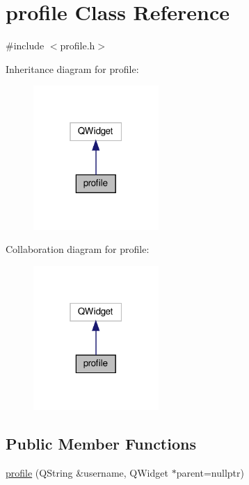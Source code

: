 \hypertarget{classprofile}{}\section{profile Class Reference}
\label{classprofile}


{\ttfamily \#include $<$profile.\+h$>$}



Inheritance diagram for profile\+:
\nopagebreak
\begin{figure}[H]
\begin{center}
\leavevmode
\includegraphics[width=135pt]{classprofile__inherit__graph}
\end{center}
\end{figure}


Collaboration diagram for profile\+:
\nopagebreak
\begin{figure}[H]
\begin{center}
\leavevmode
\includegraphics[width=135pt]{classprofile__coll__graph}
\end{center}
\end{figure}
\subsection*{Public Member Functions}
\begin{DoxyCompactItemize}
\item 
\hyperlink{classprofile_a345e4de8245d251526e2e908deb323e0}{profile} (Q\+String \&username, Q\+Widget $\ast$parent=nullptr)
\end{DoxyCompactItemize}
